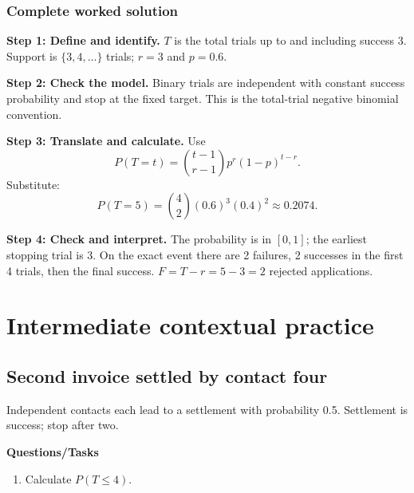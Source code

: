 \subsubsection*{Complete worked solution}
\par\noindent\begin{minipage}{\linewidth}
\textbf{Step 1: Define and identify.} $T$ is the total trials up to and including success 3. Support is $\{3,4,\ldots\}$ trials; $r=3$ and $p=0.6$.
\end{minipage}\par\medskip
\par\noindent\begin{minipage}{\linewidth}
\textbf{Step 2: Check the model.} Binary trials are independent with constant success probability and stop at the fixed target. This is the total-trial negative binomial convention.
\end{minipage}\par\medskip
\par\noindent\begin{minipage}{\linewidth}
\textbf{Step 3: Translate and calculate.} Use
\[P(T=t)=\binom{t-1}{r-1}p^r(1-p)^{t-r}.\]
Substitute:
\[P(T=5)=\binom{4}{2}(0.6)^3(0.4)^{2}\approx 0.2074.\]
\end{minipage}\par\medskip
\par\noindent\begin{minipage}{\linewidth}
\textbf{Step 4: Check and interpret.} The probability is in $[0,1]$; the earliest stopping trial is 3. On the exact event there are 2 failures, 2 successes in the first 4 trials, then the final success. $F=T-r=5-3=2$ rejected applications.
\end{minipage}\par\medskip
{}
\section{Intermediate contextual practice}\label{sec:t2-c6-intermediate}
\subsection{Second invoice settled by contact four}
Independent contacts each lead to a settlement with probability 0.5. Settlement is success; stop after two.

\textbf{Questions/Tasks}
\begin{enumerate}
\item Calculate $P(T\leq4)$. 
\end{enumerate}
